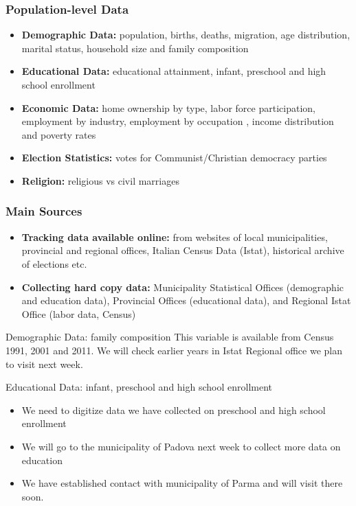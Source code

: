 \begin{frame}
\frametitle{Population-level Data}
\begin{itemize} 
\item \textbf{Demographic Data:} population, births, deaths, migration, age distribution, marital status,  household size and family composition

\item \textbf{Educational Data:}  educational attainment, infant, preschool and high school enrollment 

\item \textbf{Economic Data:} home ownership by type, labor force participation, employment by industry, employment by occupation , income distribution and poverty rates

\item \textbf{Election Statistics:} votes for Communist/Christian democracy parties

\item \textbf{Religion:}  religious vs civil marriages 

\end{itemize}
\end{frame}
\begin{frame}
\frametitle{Main Sources}
\begin{itemize}
\item \textbf{Tracking data available online:} from websites of local municipalities, provincial and regional offices, Italian Census Data (Istat), historical archive of elections etc.


\item \textbf{Collecting hard copy data:}
Municipality Statistical Offices (demographic and education data), Provincial Offices (educational data),
and Regional Istat Office (labor data, Census) 

\end{itemize}
\end{frame}
\begin{frame}
\begin{block}{Demographic Data: family composition}
This variable is available from Census 1991, 2001 and 2011. We will check earlier years in Istat Regional office we plan to visit next week. 
\end{block}

\begin{block}{Educational Data: infant, preschool and high school enrollment}
\begin{itemize}
\item We need to digitize data we have collected on preschool and high school enrollment
\item We will go to the municipality of Padova next week to collect more data on education
\item We have established contact with municipality of Parma and will visit there soon.
\end{itemize}
\end{block}
\end{frame}
